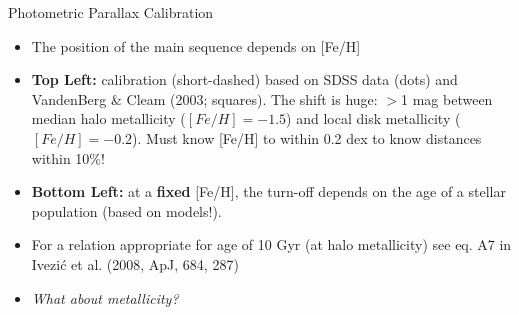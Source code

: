 \documentclass[letterpaper,landscape]{slides}
\begin{document}
\begin{slide}
{\begin{minipage}[t]{8cm}
\begin{center}
\end{center}
\end{minipage}

\begin{minipage}[t]{16cm}
\begin{center}
\vskip -1in
{\large \color{red} Photometric Parallax Calibration}
\end{center}


\begin{itemize}
\item {\color{blue} The position of the main sequence depends on [Fe/H]}
\item {\bf Top Left:} calibration (short-dashed) based on SDSS data (dots) and VandenBerg 
       \& Cleam (2003; squares). The shift is huge: $>$1 mag between median 
       halo metallicity ($[Fe/H]=-1.5$) and local disk metallicity  
       ($[Fe/H]=-0.2$).  {\color{blue} Must know [Fe/H] to within 0.2 dex
       to know distances within 10\%!}
\item {\bf Bottom Left:} at a {\bf fixed} [Fe/H], the turn-off depends on 
      the age of a stellar population (based on models!). 
\item For a relation appropriate for age of 10 Gyr (at halo metallicity) see
      eq. A7 in Ivezi\'{c} et al. (2008, ApJ, 684, 287)
\item {\it What about metallicity?}
\end{itemize}

\end{minipage}}
\vfill 
\end{slide}
\end{document}
